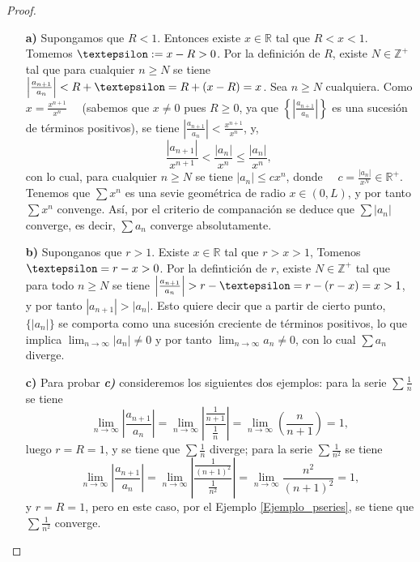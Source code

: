 \begin{proof}
  \begin{itemize}
    \item[\textbf{a)}] Supongamos que $R<1$. Entonces existe $x \in \mathbb{R}$ tal que $R<x<1$. Tomemos $\text{\textepsilon}:=x-R>0$. Por la definición de $R$, existe $N \in \mathbb{Z}^{+}$ tal que para cualquier $n \geq N$ se tiene $\left|\frac{a_{n+1}}{a_n}\right|<R+\text{\textepsilon}=R+(x-R)=x$. Sea $n \geq N$ cualquiera. Como
    $x=\frac{x^{n+1}}{x^n} \quad$ (sabemos que $x \neq 0$ pues $R \geq 0$, ya que $\left\{\left|\frac{a_{n+1}}{a_n}\right|\right\}$ es una sucesión de términos positivos), se tiene $\left|\frac{a_{n+1}}{a_n}\right|<\frac{x^{n+1}}{x^n}$, y,
      $$
        \frac{\left|a_{n+1}\right|}{x^{n+1}}<\frac{\left|a_n\right|}{x^n} \leq \frac{\left|a_n\right|}{x^n} \text {, }
      $$
    con lo cual, para cualquier $n \geq N$ se tiene $\left|a_n\right| \leq c x^n$, donde $\quad c=\frac{\left|a_n\right|}{x^N} \in \mathbb{R}^{+}$. Tenemos que $\sum x^n$ es una sevie geométrica de radio $x \in(0, L)$, y por tanto $\sum x^n$ convenge. Así, por el criterio de companación se deduce que $\sum |a_n|$ converge, es decir, $\sum a_n$ converge absolutamente.
    \item[\textbf{b)}] Suponganos que $r>1$. Existe $x \in \mathbb{R}$ tal que $r>x>1$, Tomenos $\text{\textepsilon}=r-x>0$. Por la defintición de $r$, existe $N \in \mathbb{Z}^{+}$ tal que para todo $n \geq N$ se tiene $\left|\frac{a_{n+1}}{a_n}\right|>r-\text{\textepsilon}=r-(r-x)=x>1$, y por tanto $\left|a_{n+1}\right|>\left|a_n\right|$. Esto quiere decir que a partir de cierto punto, $\lbrace{|a_n|\rbrace}$ se comporta como una sucesión creciente de términos positivos, lo que implica $\lim _{n \rightarrow \infty}\left|a_n\right| \neq 0$ y por tanto $\lim _{n \rightarrow \infty} a_n \neq 0$, con lo cual $\sum a_n$ diverge.
    \item[\textbf{c)}] Para probar \textit{\textbf{c)}} consideremos los siguientes dos ejemplos: para la serie $\sum \frac{1}{n}$ se tiene
      $$
        \lim _{{n\rightarrow \infty}}\left|\frac{a_{n+1}}{a_n}\right|=\lim _{n \rightarrow \infty}\left|\frac{\frac{1}{n+1}}{\frac{1}{n}}\right|=\lim _{n \rightarrow \infty}\left(\frac{n}{n+1}\right)=1,
      $$
      luego $r=R=1$, y se tiene que $\sum \frac{1}{n}$ diverge; para la serie $\sum \frac{1}{n^2}$ se tiene
      $$
        \lim _{n \rightarrow \infty}\left|\frac{a_{n+1}}{a_n}\right|=\lim _{n \rightarrow \infty}\left|\frac{\frac{1}{(n+1)^2}}{\frac{1}{n^2}}\right|=\lim _{n \rightarrow \infty} \frac{n^2}{(n+1)^2}=1,
      $$
      y $r=R=1$, pero en este caso, por el Ejemplo \ref{Ejemplo_pseries}, se tiene que $\sum \frac{1}{n^2}$ converge.
  \end{itemize}
\end{proof}


